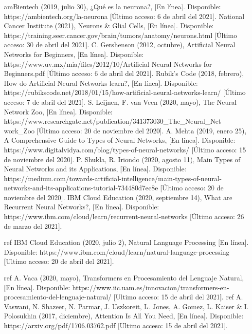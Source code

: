 \documentclass[12pt, a4paper, titlepage]{report}
\begin{document}
\begin{thebibliography}{20}
	amBientech (2019, julio 30), ¿Qué es la neurona?, [En línea]. Disponible: https://ambientech.org/la-neurona [Último acceso: 6 de abril del 2021].
	National Cancer Institute (2021), Neurons \& Glial Cells, [En línea]. Disponible: https://training.seer.cancer.gov/brain/tumors/anatomy/neurons.html [Último acceso: 30 de abril del 2021].	
	C. Gershenson (2012, octubre), Artificial Neural Networks for Beginners, [En línea]. Disponible: https://www.uv.mx/mia/files/2012/10/Artificial-Neural-Networks-for-Beginners.pdf [Último acceso: 6 de abril del 2021].
	Rubik's Code  (2018, febrero), How do Artificial Neural Networks learn?, [En línea]. Disponible: https://rubikscode.net/2018/01/15/how-artificial-neural-networks-learn/ [Último acceso: 7 de abril del 2021].	
	S. Leijnen, F. van Veen (2020, mayo), The Neural Network Zoo, [En línea]. Disponible: https://www.researchgate.net/publication/341373030\_The\_Neural\_Net\\work\_Zoo [Último acceso: 20 de noviembre del 2020].
	A. Mehta (2019, enero 25), A Comprehensive Guide to Types of Neural Networks, [En línea]. Disponible: https://www.digitalvidya.com/blog/types-of-neural-networks/ [Último acceso: 15 de noviembre del 2020].
	P. Shukla, R. Iriondo (2020, agosto 11), Main Types of Neural Networks and its Applications, [En línea]. Disponible: https://medium.com/towards-artificial-intelligence/main-types-of-neural-networks-and-its-applications-tutorial-734480d7ec8e [Último acceso: 20 de noviembre del 2020].
	IBM Cloud Education (2020, septiembre 14), What are Recurrent Neural Networks?, [En línea]. Disponible: https://www.ibm.com/cloud/learn/recurrent-neural-networks [Último acceso: 26 de marzo del 2021].
	
	ref IBM Cloud Education (2020, julio 2), Natural Language Processing [En línea]. Disponible: https://www.ibm.com/cloud/learn/natural-language-processing [Ultimo acceso: 20 de abril del 2021].
	
	ref A. Vaca (2020, mayo), Transformers en Procesamiento del Lenguaje Natural, [En línea]. Disponible: https://www.iic.uam.es/innovacion/transformers-en-procesamiento-del-lenguaje-natural/  [Ultimo acceso: 15 de abril del 2021].
	ref A. Vaswani, N. Shazeer, N. Parmar, J. Uszkoreit, L. Jones, A. Gomez, L. Kaiser \&  I. Polosukhin (2017, diciembre), Attention Is All You Need, [En línea]. Disponible: https://arxiv.org/pdf/1706.03762.pdf  [Ultimo acceso: 15 de abril del 2021].


\end{thebibliography}
\end{document}
